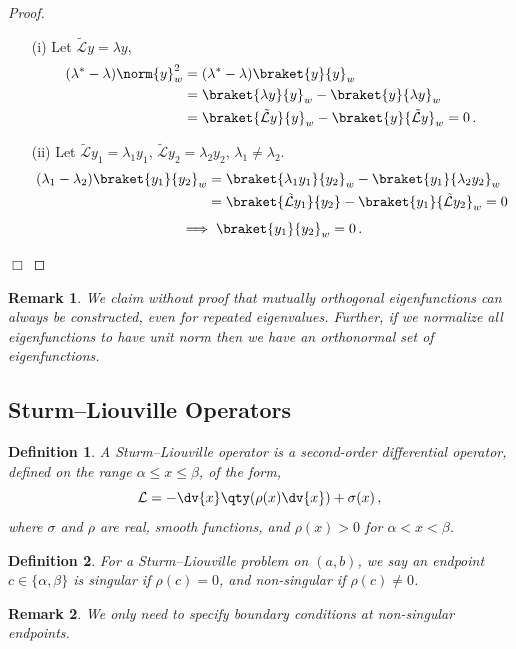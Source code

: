\documentclass{article}
\theoremstyle{plain}\theoremheaderfont{\normalfont\itshape}\theorembodyfont{\rmfamily}\theoremseparator{.}\newtheorem*{rem}{Remark}\newtheorem*{ex}{Example}\newtheorem*{proof}{Proof}\newtheorem*{altp}{Alternative proof}
\theoremstyle{plain}\theoremheaderfont{\normalfont\bfseries}\theorembodyfont{\rmfamily}\theoremseparator{.}\newtheorem{thm}{Theorem}[section]\newtheorem{lem}[thm]{Lemma}\newtheorem{prop}[thm]{Proposition}\newtheorem*{cor}{Corollary}\newtheorem{defn}[thm]{Definition}\newtheorem{clm}[thm]{Claim}\newtheorem{clminproof}{Claim}
\theoremstyle{break}\theoremheaderfont{\normalfont\itshape}\theorembodyfont{\rmfamily}\theoremseparator{.\medskip}\newtheorem*{proofskip}{Proof}\newtheorem*{exs}{Examples}\newtheorem*{rems}{Remarks}
\theoremstyle{break}\theoremheaderfont{\normalfont\bfseries}\theorembodyfont{\rmfamily}\theoremseparator{.\medskip}\newtheorem{lemskip}[thm]{Lemma}\newtheorem{defnskip}[thm]{Definition}\newtheorem{propskip}[thm]{Proposition}\newtheorem{thmskip}[thm]{Theorem}
\numberwithin{equation}{section}
\newcommand{\qed}{\hfill\ensuremath{\Box}}
\begin{document}
	\begin{proof}
		\begin{enumerate}[topsep=0pt]
			\item[(i)] Let \(\tilde{\mathcal{L}}y=\lambda y\),
			\begin{align*}
				(\lambda^*-\lambda)\norm{y}_w^2&=(\lambda^*-\lambda)\braket{y}{y}_w\\
				&=\braket{\lambda y}{y}_w-\braket{y}{\lambda y}_w\\
				&=\braket{\tilde{\mathcal{L}}y}{y}_w-\braket{y}{\tilde{\mathcal{L}}y}_w=0\,.
			\end{align*}
			\item[(ii)] Let \(\tilde{\mathcal{L}}y_1=\lambda_1y_1\), \(\tilde{\mathcal{L}}y_2=\lambda_2y_2\), \(\lambda_1\ne \lambda_2\).
			\begin{align*}
				(\lambda_1-\lambda_2)\braket{y_1}{y_2}_w&=\braket{\lambda_1 y_1}{y_2}_w-\braket{y_1}{\lambda_2y_2}_w\\
				&=\braket{\tilde{\mathcal{L}}y_1}{y_2}-\braket{y_1}{\tilde{\mathcal{L}}y_2}_w=0
			\end{align*}
			\[\implies \braket{y_1}{y_2}_w=0\,.\]
		\end{enumerate}\qed
	\end{proof}

	\begin{rem}
		We claim without proof that mutually orthogonal eigenfunctions can always be constructed, even for repeated eigenvalues. Further, if we normalize all eigenfunctions to have unit norm then we have an orthonormal set of eigenfunctions.
	\end{rem}

	\subsection{Sturm--Liouville Operators}
	\begin{defn}
		A \textit{Sturm--Liouville operator} is a second-order differential operator, defined on the range \(\alpha\le x\le\beta\), of the form,
		\[\mathcal{L}=-\dv{x}\qty(\rho(x)\dv{x})+\sigma(x)\,,\]
		where \(\sigma\) and \(\rho\) are real, smooth functions, and \(\rho(x)>0\) for \(\alpha<x<\beta\).
	\end{defn}
	\begin{defn}
		For a Sturm--Liouville problem on \((a,b)\), we say an endpoint \(c\in\{\alpha,\beta\}\) is \textit{singular} if \(\rho(c)=0\), and \textit{non-singular} if \(\rho(c)\ne 0\).
	\end{defn}
	\begin{rem}
		We only need to specify boundary conditions at non-singular endpoints.
	\end{rem}
\end{document}
